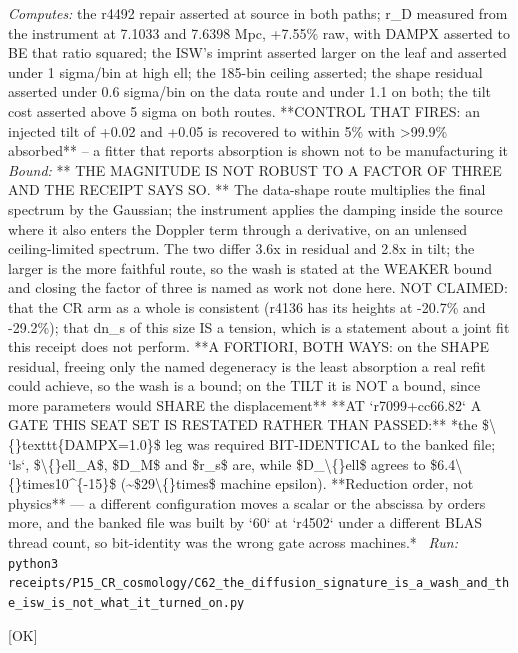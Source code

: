 \begin{description}
\emph{Computes:} the r4492 repair asserted at source in both paths; r\_D measured from the instrument at 7.1033 and 7.6398 Mpc, +7.55\% raw, with DAMPX asserted to BE that ratio squared; the ISW's imprint asserted larger on the leaf and asserted under 1 sigma/bin at high ell; the 185-bin ceiling asserted; the shape residual asserted under 0.6 sigma/bin on the data route and under 1.1 on both; the tilt cost asserted above 5 sigma on both routes. **CONTROL THAT FIRES: an injected tilt of +0.02 and +0.05 is recovered to within 5\% with >99.9\% absorbed** -- a fitter that reports absorption is shown not to be manufacturing it
 \emph{Bound:} ** THE MAGNITUDE IS NOT ROBUST TO A FACTOR OF THREE AND THE RECEIPT SAYS SO. ** The data-shape route multiplies the final spectrum by the Gaussian; the instrument applies the damping inside the source where it also enters the Doppler term through a derivative, on an unlensed ceiling-limited spectrum. The two differ 3.6x in residual and 2.8x in tilt; the larger is the more faithful route, so the wash is stated at the WEAKER bound and closing the factor of three is named as work not done here. NOT CLAIMED: that the CR arm as a whole is consistent (r4136 has its heights at -20.7\% and -29.2\%); that dn\_s of this size IS a tension, which is a statement about a joint fit this receipt does not perform. **A FORTIORI, BOTH WAYS: on the SHAPE residual, freeing only the named degeneracy is the least absorption a real refit could achieve, so the wash is a bound; on the TILT it is NOT a bound, since more parameters would SHARE the displacement**  **AT `r7099+cc66.82` A GATE THIS SEAT SET IS RESTATED RATHER THAN PASSED:** *the \$\textbackslash\{\}texttt\{DAMPX=1.0\}\$ leg was required BIT-IDENTICAL to the banked file; `ls`, \$\textbackslash\{\}ell\_A\$, \$D\_M\$ and \$r\_s\$ are, while \$D\_\textbackslash\{\}ell\$ agrees to \$6.4\textbackslash\{\}times10\textasciicircum{}\{-15\}\$ (\textasciitilde{}\$29\textbackslash\{\}times\$ machine epsilon). **Reduction order, not physics** --- a different configuration moves a scalar or the abscissa by orders more, and the banked file was built by `60` at `r4502` under a different BLAS thread count, so bit-identity was the wrong gate across machines.*
\ \emph{Run:} \texttt{python3 receipts/P15\_CR\_cosmology/C62\_the\_diffusion\_signature\_is\_a\_wash\_and\_the\_isw\_is\_not\_what\_it\_turned\_on.py}
\item[\rcptlabel{C61_the_undriven_premise_is_false_on_the_rate_the_framework_assigns_the_perturbations}{P15R111}\textbf{P15R111}\quad\texttt{C61\_the\_undriven\_premise\_is\_false\_on\_the\_rate\_the\_framework\_assigns\_the\_perturbations}]\hfill\textsf{[OK]}\\

\end{description}
